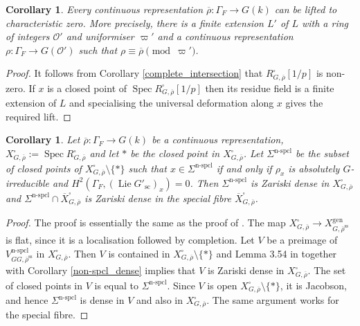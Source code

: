 \documentclass{amsart}
\newtheorem{cor}[prop]{Corollary}
\theoremstyle{definition}
\theoremstyle{remark}
\DeclareMathOperator{\Spec}{Spec}
\newcommand{\OO}{\mathcal O}
\newcommand{\rhobar}{\overline{\rho}}
\newcommand{\gen}{\mathrm{gen}}
\newcommand{\Xbar}{\overline{X}}
\DeclareMathOperator{\nspcl}{n-spcl}
\DeclareMathOperator{\Lie}{Lie}
\newcommand{\rhobarss}{\rhobar^{\mathrm{ss}}}
\newcommand{\sic}{\operatorname{sc}}
\begin{document}
\begin{cor}\label{char_zero_lift} Every continuous representation $\rhobar: \Gamma_F \rightarrow G(k)$ can be lifted to characteristic 
zero. More precisely, there is a finite extension $L'$ of $L$ with a ring of integers $\OO'$ and uniformiser $\varpi'$ and 
a continuous representation
$\rho: \Gamma_F \rightarrow G(\OO')$ such that $\rho \equiv \rhobar \pmod{\varpi'}$.
\end{cor} 
\begin{proof} It follows from Corollary \ref{complete_intersection} that 
$R^{\square}_{G, \rhobar}[1/p]$
is non-zero. If $x$ is a closed point of $\Spec R^{\square}_{G, \rhobar}[1/p]$ then 
its residue field is a finite extension of $L$ and specialising the universal 
deformation along $x$ gives the required lift. 
\end{proof} 

\begin{cor}\label{dense_formal} Let $\rhobar: \Gamma_F \rightarrow G(k)$ be a continuous representation, 
$X^{\square}_{G, \rhobar}:= \Spec R^{\square}_{G, \rhobar}$ and let $\ast$
be the closed point in $X^{\square}_{G, \rhobar}$. Let $\Sigma^{\nspcl}$ be the
subset of closed points of $X^{\square}_{G, \rhobar}\setminus \{\ast\}$ such that 
$x\in \Sigma^{\nspcl}$ if and only if $\rho_x$ is absolutely $G$-irreducible and 
$H^2(\Gamma_F, (\Lie G'_{\sic})_x)=0$. Then $\Sigma^{\nspcl}$ is Zariski dense
in $X^{\square}_{G, \rhobar}$ and $\Sigma^{\nspcl}\cap \Xbar^{\square}_{G, \rhobar}$ 
is Zariski dense in the special fibre $\Xbar^{\square}_{G, \rhobar}$. 
\end{cor}
\begin{proof} The proof is essentially the same as the proof of \cite[Proposition 3.55]{BIP_new}. 
The map $X^{\square}_{G, \rhobar} \rightarrow X^{\gen}_{G, \rhobarss}$ is flat, since 
it is a localisation followed by completion. Let $V$ be a preimage of $V^{\nspcl}_{GG, \rhobarss}$
in $X^{\square}_{G, \rhobar}$. Then $V$ is contained in $X^{\square}_{G, \rhobar}\setminus \{\ast\}$
and Lemma 3.54 in \cite{BIP_new} together with Corollary \ref{non-spcl_dense} implies that $V$ is Zariski dense in $X^{\square}_{G, \rhobar}$.
The set of closed points in $V$ is equal to $\Sigma^{\nspcl}$. 
Since $V$ is open $X^{\square}_{G, \rhobar}\setminus \{\ast\}$, it is Jacobson, and hence $\Sigma^{\nspcl}$ is dense in $V$ and also in $X^{\square}_{G, \rhobar}$. The same argument works for the special fibre. 
\end{proof} 
\end{document}
